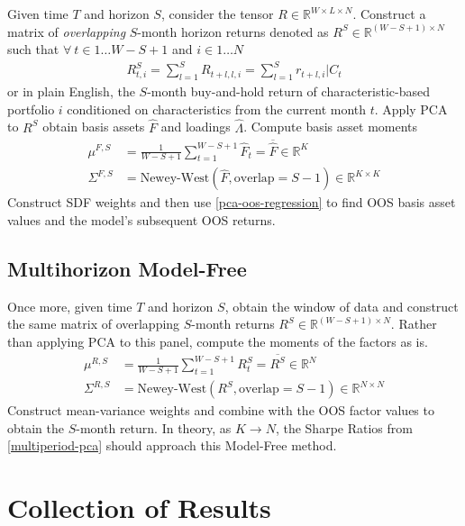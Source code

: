 \documentclass{article}
\newcommand{\R}{{\mathbb R}}
\begin{document}
Given time $T$ and horizon $S$, consider the tensor $R \in \R^{W \times L \times N}$. 
Construct a matrix of \emph{overlapping} $S$-month horizon returns denoted as $R^S \in \R^{(W-S+1) \times N}$ such that $\forall \ t \in 1 \ldots W - S + 1$ and 
$i \in 1 \ldots N$
\begin{align}
    R^S_{t, i} = \sum_{l=1}^S R_{t+l, l, i} = \sum_{l=1}^S r_{t+l, i} | C_t
\end{align}
or in plain English, the $S$-month buy-and-hold return of characteristic-based portfolio $i$ 
conditioned on characteristics from the current month $t$. Apply PCA to $R^S$ obtain 
basis assets $\widehat{F}$ and loadings $\widehat{\Lambda}$. Compute basis asset moments 
\begin{align*}
    \mu^{F, S} &= \frac{1}{W-S+1} \sum_{t=1}^{W-S+1} \widehat{F}_t = \overline{\widehat{F}} \in \R^{K}\\
    \Sigma^{F, S} &= \text{Newey-West}(\widehat{F}, \text{overlap}=S-1) \in \R^{K \times K}
\end{align*}
Construct SDF weights and then use \ref{pca-oos-regression} to find OOS basis asset values and the model's 
subsequent OOS returns.

\subsection{Multihorizon Model-Free}

Once more, given time $T$ and horizon $S$, obtain the window of data and construct the same matrix of overlapping 
$S$-month returns $R^S \in \R^{(W-S+1) \times N}$. Rather than applying PCA to this panel, 
compute the moments of the factors as is. 
\begin{align*}
    \mu^{R, S} &= \frac{1}{W-S+1} \sum_{t=1}^{W-S+1} R^S_t = \overline{R^S} \in \R^{N}\\
    \Sigma^{R, S} &= \text{Newey-West}(R^S, \text{overlap}=S-1) \in \R^{N \times N}
\end{align*}
Construct mean-variance weights and combine with the OOS factor values to obtain the $S$-month return. 
In theory, as $K \to N$, the Sharpe Ratios from \ref{multiperiod-pca} should approach this Model-Free method.

\newpage

\section{Collection of Results}

\listoffigures
\end{document}
